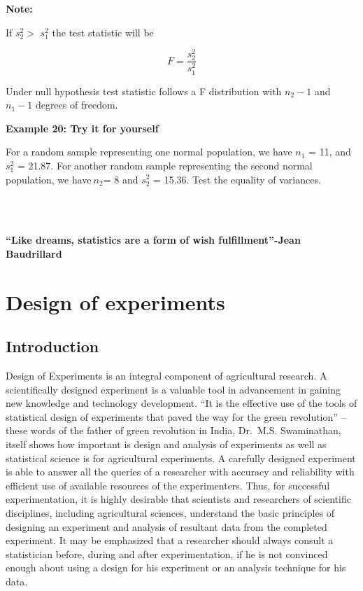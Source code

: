 \documentclass[
]{book}
\begin{document}
\textbf{Note:}

If \(s_{2}^{2} >\) \(s_{1}^{2}\) the test statistic will be

\[F = \frac{s_{2}^{2}}{s_{1}^{2}}\]

Under null hypothesis test statistic follows a F distribution with \(n_{2} - 1\) and \(n_{1} - 1\) degrees of freedom.

\textbf{Example 20: Try it for yourself}

For a random sample representing one normal population, we have \(n_{1}\) = 11, and \(s_{1}^{2}\) = 21.87. For another random sample representing the second normal population, we have\(\ n_{2}\)= 8 and \(s_{2}^{2}\) = 15.36. Test the equality of variances.

~\\
\hspace*{0.333em}\\
\hspace*{0.333em}

\hypertarget{hello}{}
\textbf{``Like dreams, statistics are a form of wish fulfillment''-Jean Baudrillard}

\hypertarget{design-of-experiments}{%
\chapter{Design of experiments}\label{design-of-experiments}}

\hypertarget{introduction-1}{%
\section{Introduction}\label{introduction-1}}

Design of Experiments is an integral component of agricultural research. A scientifically designed experiment is a valuable tool in advancement in gaining new knowledge and technology development. ``It is the effective use of the tools of statistical design of experiments that paved the way for the green revolution'' -- these words of the father of green revolution in India, Dr.~M.S. Swaminathan, itself shows how important is design and analysis of experiments as well as statistical science is for agricultural experiments. A carefully designed experiment is able to answer all the queries of a researcher with accuracy and reliability with efficient use of available resources of the experimenters. Thus, for successful experimentation, it is highly desirable that scientists and researchers of scientific disciplines, including agricultural sciences, understand the basic principles of designing an experiment and analysis of resultant data from the completed experiment. It may be emphasized that a researcher should always consult a statistician before, during and after experimentation, if he is not convinced enough about using a design for his experiment or an analysis technique for his data.
\end{document}
